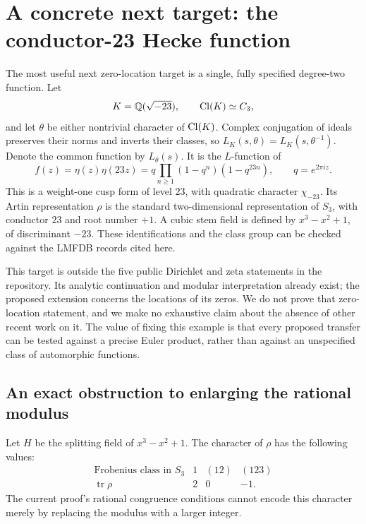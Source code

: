 \section{A concrete next target: the conductor-23 Hecke function}
\label{sec:hecke23}

The most useful next zero-location target is a single, fully specified
degree-two function. Let
\[
 K=\mathbb Q(\sqrt{-23}),\qquad \operatorname{Cl}(K)\simeq C_3,
\]
and let $\theta$ be either nontrivial character of $\operatorname{Cl}(K)$. Complex
conjugation of ideals preserves their norms and inverts their classes, so
$L_K(s,\theta)=L_K(s,\theta^{-1})$. Denote the common function by
$L_\theta(s)$. It is the $L$-function of
\begin{equation}\label{eq:eta23}
 f(z)=\eta(z)\eta(23z)
 =q\prod_{n\geq1}(1-q^n)(1-q^{23n}),\qquad q=e^{2\pi i z}.
\end{equation}
This is a weight-one cusp form of level $23$, with quadratic character
$\chi_{-23}$. Its Artin representation $\rho$ is the standard
two-dimensional representation of $S_3$, with conductor $23$ and root
number $+1$. A cubic stem field is defined by $x^3-x^2+1$, of
discriminant $-23$. These identifications and the class group can be checked
against the LMFDB records cited here.\cite{lmfdbQuadratic,lmfdbArtin,lmfdbForm}

This target is outside the five public Dirichlet and zeta statements in the
repository. Its analytic continuation and modular interpretation already
exist; the proposed extension concerns the locations of its zeros. We do
not prove that zero-location statement, and we make no exhaustive claim
about the absence of other recent work on it. The value of fixing this
example is that every proposed transfer can be tested against a precise
Euler product, rather than against an unspecified class of automorphic
functions.

\subsection{An exact obstruction to enlarging the rational modulus}

Let $H$ be the splitting field of $x^3-x^2+1$. The character of $\rho$ has
the following values:
\[
\begin{array}{c|ccc}
 \text{Frobenius class in }S_3&1&(12)&(123)\\ \hline
 \operatorname{tr}\rho&2&0&-1.
\end{array}
\]
The current proof's rational congruence conditions cannot encode this
character merely by replacing the modulus with a larger integer.

